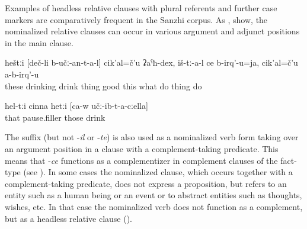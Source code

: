 Examples of headless relative clauses with plural referents and further case markers are comparatively frequent in the Sanzhi corpus. As ,  show, the nominalized relative clauses can occur in various argument and adjunct positions in the main clause.
%
\begin{exe}
	\ex	\label{ex:‎The ones who are drinking, what good things do they do, they do not do anything (good)}
	\gll	heštːi	[deč-li	b-učː-an-t-a-l]	cik'al=č'u	ʡaˁħ-dex,	iš-tː-a-l	ce	b-irq'-u=ja,		cik'al=č'u	a-b-irq'-u\\
		these	drinking	drink	thing	good	this	what	do	thing	do\\
	\glt	{}

	\ex	\label{ex:these, hm, with whom (he) himself was drinking}
	\gll	hel-tːi	cinna	hetːi	[ca-w	učː-ib-t-a-cːella]\\
		that	pause.filler	those		drink\\
	\glt	{}
\end{exe}

The suffix  (but not -\textit{il} or -\textit{te}) is also used as a nominalized verb form taking over an argument position in a clause with a complement-taking predicate. This means that -\textit{ce} functions as a complementizer in complement clauses of the fact-type (see ). In some cases the nominalized clause, which occurs together with a complement-taking predicate, does not express a proposition, but refers to an entity such as a human being or an event or to abstract entities such as thoughts, wishes, etc. In that case the nominalized verb does not function as a complement, but as a headless relative clause ().

